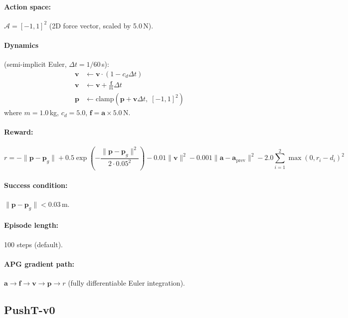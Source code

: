 \documentclass[11pt,a4paper]{article}
\newcommand{\cA}{\mathcal{A}}
\newcommand{\bvf}{\mathbf{v}}
\newcommand{\bpf}{\mathbf{p}}
\newcommand{\bff}{\mathbf{f}}
\newcommand{\ba}{\mathbf{a}}
\begin{document}
\paragraph{Action space:} $\cA = [-1, 1]^2$ (2D force vector, scaled by 5.0\,N).

\paragraph{Dynamics} (semi-implicit Euler, $\Delta t = 1/60$\,s):
\begin{align}
  \bvf &\leftarrow \bvf \cdot (1 - c_d \Delta t) \\
  \bvf &\leftarrow \bvf + \frac{\bff}{m} \Delta t \\
  \bpf &\leftarrow \text{clamp}\!\left(\bpf + \bvf \Delta t,\; [-1, 1]^2\right)
\end{align}
where $m = 1.0$\,kg, $c_d = 5.0$, $\bff = \ba \times 5.0$\,N.

\paragraph{Reward:}
\begin{equation}
  r = -\|\bpf - \bpf_g\| + 0.5\exp\!\left(-\frac{\|\bpf - \bpf_g\|^2}{2 \cdot 0.05^2}\right) - 0.01\|\bvf\|^2 - 0.001\|\ba - \ba_{\text{prev}}\|^2 - 2.0 \sum_{i=1}^{2} \max(0, r_i - d_i)^2
  \label{eq:pm_reward}
\end{equation}

\paragraph{Success condition:} $\|\bpf - \bpf_g\| < 0.03$\,m.

\paragraph{Episode length:} 100 steps (default).

\paragraph{APG gradient path:} $\ba \rightarrow \bff \rightarrow \bvf \rightarrow \bpf \rightarrow r$ (fully differentiable Euler integration).

\subsection{PushT-v0}
\label{sec:env_pusht}
\end{document}

